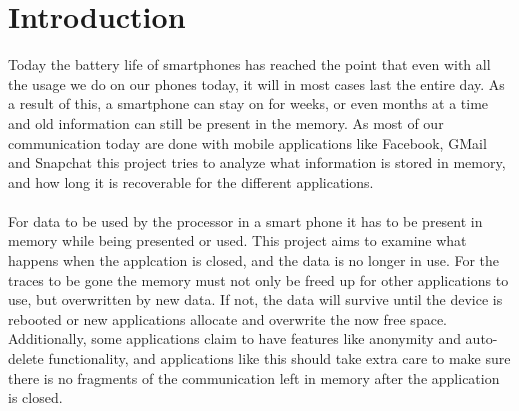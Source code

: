 \section{Introduction}
Today the battery life of smartphones has reached the point that even with all the usage we do on our phones today, it will in most cases last the entire day. As a result of this, a smartphone can stay on for weeks, or even months at a time and old information can still be present in the memory. As most of our communication today are done with mobile applications like Facebook, GMail and Snapchat this project tries to analyze what information is stored in memory, and how long it is recoverable for the different applications. \\ \\
For data to be used by the processor in a smart phone it has to be present in memory while being presented or used. This project aims to examine what happens when the applcation is closed, and the data is no longer in use. For the traces to be gone the memory must not only be freed up for other applications to use, but overwritten by new data. If not, the data will survive until the device is rebooted or new applications allocate and overwrite the now free space. Additionally, some applications claim to have features like anonymity and auto-delete functionality, and applications like this should take extra care to make sure there is no fragments of the communication left in memory after the application is closed.